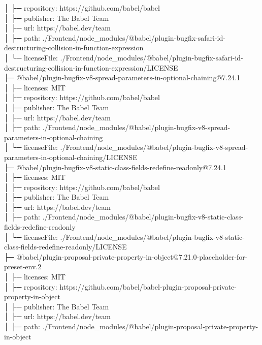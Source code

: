 \documentclass[
    paper=a4,
    twoside=false,
    parskip=half,
    listof=entryprefix,
    listof=totoc,
    index=totoc,
    bibliography=totoc,
    headsepline,
]{scrbook}
\begin{document}
    │  ├─ repository: https://github.com/babel/babel\\
    │  ├─ publisher: The Babel Team\\
    │  ├─ url: https://babel.dev/team\\
    │  ├─ path: ./Frontend/node\_modules/@babel/plugin-bugfix-safari-id-destructuring-collision-in-function-expression\\
    │  └─ licenseFile: ./Frontend/node\_modules/@babel/plugin-bugfix-safari-id-destructuring-collision-in-function-expression/LICENSE\\
    ├─ @babel/plugin-bugfix-v8-spread-parameters-in-optional-chaining@7.24.1\\
    │  ├─ licenses: MIT\\
    │  ├─ repository: https://github.com/babel/babel\\
    │  ├─ publisher: The Babel Team\\
    │  ├─ url: https://babel.dev/team\\
    │  ├─ path: ./Frontend/node\_modules/@babel/plugin-bugfix-v8-spread-parameters-in-optional-chaining\\
    │  └─ licenseFile: ./Frontend/node\_modules/@babel/plugin-bugfix-v8-spread-parameters-in-optional-chaining/LICENSE\\
    ├─ @babel/plugin-bugfix-v8-static-class-fields-redefine-readonly@7.24.1\\
    │  ├─ licenses: MIT\\
    │  ├─ repository: https://github.com/babel/babel\\
    │  ├─ publisher: The Babel Team\\
    │  ├─ url: https://babel.dev/team\\
    │  ├─ path: ./Frontend/node\_modules/@babel/plugin-bugfix-v8-static-class-fields-redefine-readonly\\
    │  └─ licenseFile: ./Frontend/node\_modules/@babel/plugin-bugfix-v8-static-class-fields-redefine-readonly/LICENSE\\
    ├─ @babel/plugin-proposal-private-property-in-object@7.21.0-placeholder-for-preset-env.2\\
    │  ├─ licenses: MIT\\
    │  ├─ repository: https://github.com/babel/babel-plugin-proposal-private-property-in-object\\
    │  ├─ publisher: The Babel Team\\
    │  ├─ url: https://babel.dev/team\\
    │  ├─ path: ./Frontend/node\_modules/@babel/plugin-proposal-private-property-in-object\\
\end{document}
